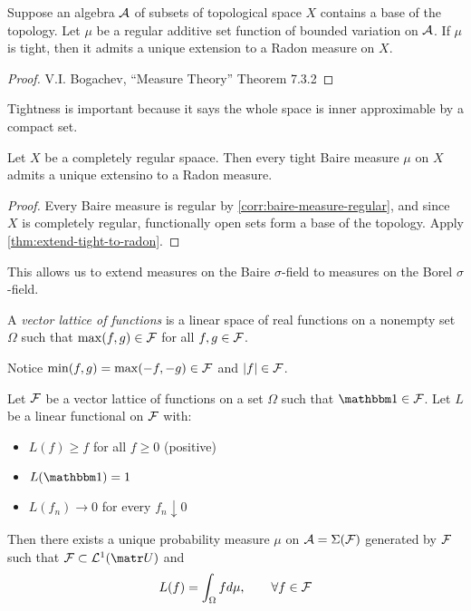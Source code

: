 
\begin{theorem}
  \label{thm:extend-tight-to-radon}
  Suppose an algebra $\mathcal{A}$ of subsets of topological space $X$
  contains a base of the topology.
  Let $\mu$ be a regular additive set function of bounded variation on $\mathcal{A}$.
  If $\mu$ is tight, then it admits a unique extension to a Radon measure on
  $X$.
\end{theorem}

\begin{proof}
  V.I. Bogachev, ``Measure Theory'' Theorem 7.3.2
\end{proof}

Tightness is important because it says the whole space is inner approximable by
a compact set.

\begin{corollary}
  Let $X$ be a completely regular spaace.
  Then every tight Baire measure $\mu$ on $X$
  admits a unique extensino to a Radon measure.
\end{corollary}

\begin{proof}
  Every Baire measure is regular by \cref{corr:baire-measure-regular},
  and since $X$ is completely regular, functionally open sets form a
  base of the topology. Apply \cref{thm:extend-tight-to-radon}.
\end{proof}

This allows us to extend measures on the Baire $\sigma$-field to measures
on the Borel $\sigma$-field.

\begin{definition}
  A \emph{vector lattice of functions} is a linear space of
  real functions on a nonempty set $\Omega$ such that
  $\max(f,g) \in \mathcal{F}$ for all $f,g \in \mathcal{F}$.

  Notice $\min(f,g) = \max(-f,-g) \in \mathcal{F}$ and $\lvert f \rvert \in \mathcal{F}$.
\end{definition}

\begin{theorem}
  Let $\mathcal{F}$ be a vector lattice of functions on a set $\Omega$
  such that $\ind \in \cF$.
  Let $L$ be a linear functional on $\mathcal{F}$ with:
  \begin{itemize}
    \item $L(f) \geq f$ for all $f \geq 0$ (positive)
    \item $L(\ind) = 1$
    \item $L(f_n) \to 0$ for every $f_n \downarrow 0$
  \end{itemize}
  Then there exists a unique probability measure $\mu$ on
  $\mathcal{A} = \Sigma(\mathcal{F})$ generated by $\mathcal{F}$ such that
  $\cF \subset \cL^1(\mU)$ and
  \[
    L(f) = \int_\Omega f d\mu,\qquad \forall f \in \mathcal{F}
  \]
\end{theorem}

